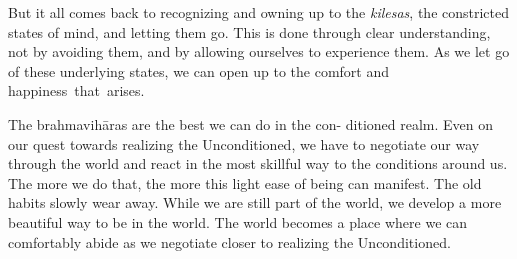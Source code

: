 But it all comes back to recognizing and owning up to the \emph{kilesas}, the constricted states of mind, and letting them go. This is done through clear understanding, not by avoiding them, and by allowing ourselves to experience them. As we let go of these underlying states, we can open up to the comfort and \mbox{happiness that arises.}

The brahmavihāras are the best we can do in the con- \linebreak ditioned realm. Even on our quest towards realizing the Unconditioned, we have to negotiate our way through the world and react in the most skillful way to the conditions around us. The more we do that, the more this light ease of being can manifest. The old habits slowly wear away. While we are still part of the world, we develop a more beautiful way to be in the world. The world becomes a place where we can comfortably abide as we negotiate closer to realizing the Unconditioned.\hfill\linebreak
